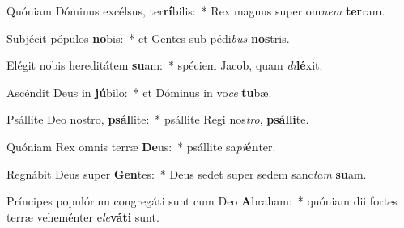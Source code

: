 \item Quóniam Dóminus excélsus, ter\textbf{rí}bilis:~* Rex magnus super om\textit{nem} \textbf{ter}ram.
\item Subjécit pópulos \textbf{no}bis:~* et Gentes sub pédi\textit{bus} \textbf{nos}tris.
\item Elégit nobis hereditátem \textbf{su}am:~* spéciem Jacob, quam \textit{di}\textbf{lé}xit.
\item Ascéndit Deus in \textbf{jú}bilo:~* et Dóminus in vo\textit{ce} \textbf{tu}bæ.
\item Psállite Deo nostro, \textbf{psál}lite:~* psállite Regi nos\textit{tro}, \textbf{psál}\textbf{li}te.
\item Quóniam Rex omnis terræ \textbf{De}us:~* psállite sa\textit{pi}\textbf{én}ter.
\item Regnábit Deus super \textbf{Gen}tes:~* Deus sedet super sedem sanc\textit{tam} \textbf{su}am.
\item Príncipes populórum congregáti sunt cum Deo \textbf{A}braham:~* quóniam dii fortes terræ veheménter e\textit{le}\textbf{vá}\textbf{ti} sunt.
